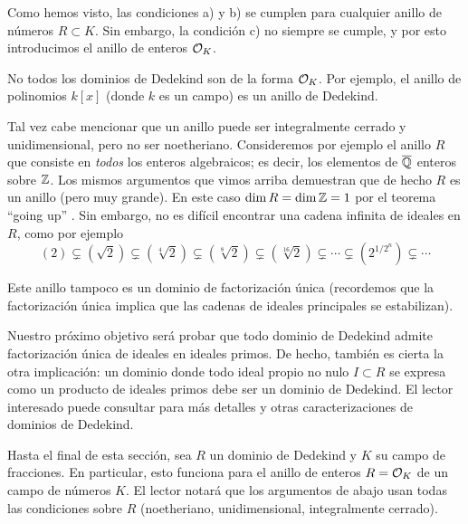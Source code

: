 Como hemos visto, las condiciones a) y b) se cumplen para cualquier anillo
de números $R \subset K$. Sin embargo, la condición c) no siempre se cumple,
y por esto introducimos el anillo de enteros $\mathcal{O}_K$.

No todos los dominios de Dedekind son de la forma $\mathcal{O}_K$. Por ejemplo,
el anillo de polinomios $k[x]$ (donde $k$ es un campo) es un anillo de Dedekind.

\begin{comentario}
  Tal vez cabe mencionar que un anillo puede ser integralmente cerrado y
  unidimensional, pero no ser noetheriano. Consideremos por ejemplo el anillo
  $R$ que consiste en \emph{todos} los enteros algebraicos; es decir,
  los elementos de $\overline{\mathbb{Q}}$ enteros sobre $\mathbb{Z}$. Los mismos argumentos
  que vimos arriba demuestran que de hecho $R$ es un anillo (pero muy grande).
  En este caso $\dim R = \dim \mathbb{Z} = 1$ por el teorema ``going up''
  \cite[Theorem 5.11]{Atiyah-Macdonald}. Sin embargo, no es difícil encontrar
  una cadena infinita de ideales en $R$, como por ejemplo
  \[ (2)\subsetneq (\sqrt{2})\subsetneq (\sqrt[4]{2})\subsetneq (\sqrt[8]{2})
       \subsetneq (\sqrt[16]{2}) \subsetneq \cdots
         \subsetneq (2^{1/2^n}) \subsetneq \cdots \]

  Este anillo tampoco es un dominio de factorización única (recordemos que
  la factorización única implica que las cadenas de ideales principales
  se estabilizan).
\end{comentario}

Nuestro próximo objetivo será probar que todo dominio de Dedekind admite
factorización única de ideales en ideales primos. De hecho, también es cierta
la otra implicación: un dominio donde todo ideal propio no nulo $I \subset R$
se expresa como un producto de ideales primos debe ser un dominio de
Dedekind. El lector interesado puede consultar \cite[Chapter 20]{Clark-CA} para
más detalles y otras caracterizaciones de dominios de Dedekind.

\vspace{1em}

Hasta el final de esta sección, sea $R$ un dominio de Dedekind y $K$ su campo
de fracciones. En particular, esto funciona para el anillo de enteros
$R = \mathcal{O}_K$ de un campo de números $K$. El lector notará que los argumentos
de abajo usan todas las condiciones sobre $R$ (noetheriano, unidimensional,
integralmente cerrado).

